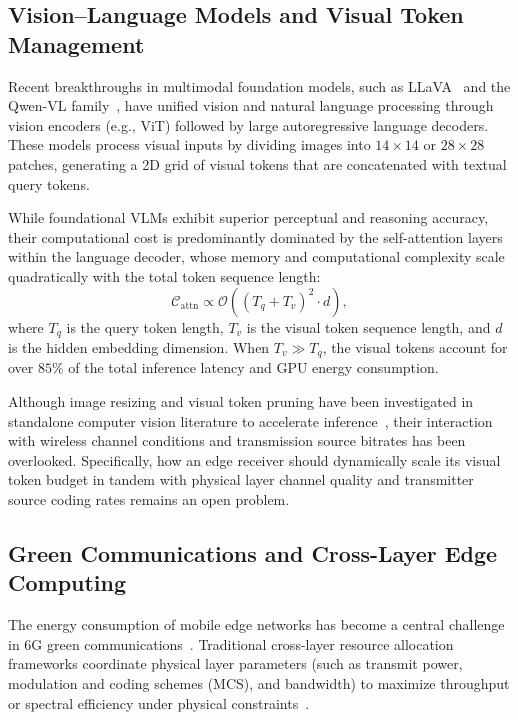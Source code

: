 \subsection{Vision--Language Models and Visual Token Management}
Recent breakthroughs in multimodal foundation models, such as LLaVA~\cite{liu2023llava} and the Qwen-VL family~\cite{wang2024qwen2vl,bai2025qwen25vl}, have unified vision and natural language processing through vision encoders (e.g., ViT) followed by large autoregressive language decoders. These models process visual inputs by dividing images into $14\times 14$ or $28\times 28$ patches, generating a 2D grid of visual tokens that are concatenated with textual query tokens.

While foundational VLMs exhibit superior perceptual and reasoning accuracy, their computational cost is predominantly dominated by the self-attention layers within the language decoder, whose memory and computational complexity scale quadratically with the total token sequence length:
\begin{equation}
\mathcal{C}_{\mathrm{attn}} \propto \mathcal{O}\left((T_q + T_v)^2 \cdot d\right),
\end{equation}
where $T_q$ is the query token length, $T_v$ is the visual token sequence length, and $d$ is the hidden embedding dimension. When $T_v \gg T_q$, the visual tokens account for over $85\%$ of the total inference latency and GPU energy consumption. 

Although image resizing and visual token pruning have been investigated in standalone computer vision literature to accelerate inference~\cite{sabanovic2026inarvl}, their interaction with wireless channel conditions and transmission source bitrates has been overlooked. Specifically, how an edge receiver should dynamically scale its visual token budget in tandem with physical layer channel quality and transmitter source coding rates remains an open problem.

\subsection{Green Communications and Cross-Layer Edge Computing}
The energy consumption of mobile edge networks has become a central challenge in 6G green communications~\cite{zheng2024aerialee,auer2011howmuch}. Traditional cross-layer resource allocation frameworks coordinate physical layer parameters (such as transmit power, modulation and coding schemes (MCS), and bandwidth) to maximize throughput or spectral efficiency under physical constraints~\cite{cui2005energy}.

